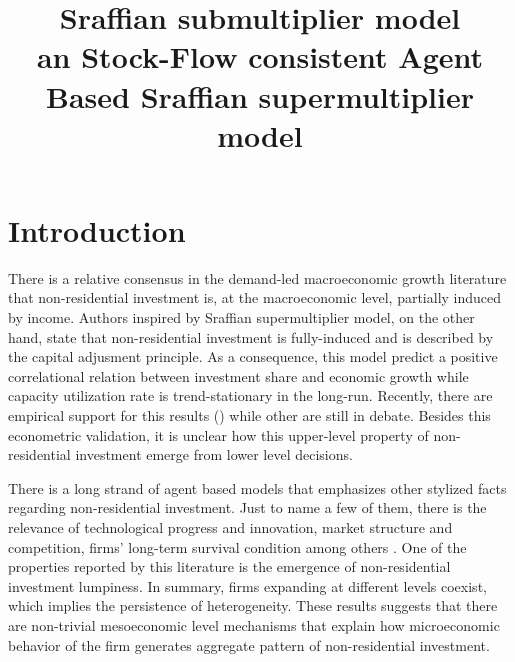 \documentclass{SelfArx}
\date{}
\title{Sraffian submultiplier model\\\medskip
\large an Stock-Flow consistent Agent Based Sraffian supermultiplier model}
\begin{document}


\newcommand{\keywordname}{Keywords} %


\flushbottom %
\maketitle %
\thispagestyle{empty} %

\section{Introduction}
\label{sec:orgee2bb40}
There is a relative consensus in the demand-led macroeconomic growth literature that non-residential investment is, at the macroeconomic level, partially induced by income.
Authors inspired by Sraffian supermultiplier model, on the other hand, state that non-residential investment is fully-induced and is described by the capital adjusment principle.
As a consequence, this model predict a positive correlational relation between investment share and economic growth while capacity utilization rate is trend-stationary in the long-run.
Recently, there are empirical support for this results () while other are still in debate.
Besides this econometric validation, it is unclear how this upper-level property of non-residential investment emerge from lower level decisions.

There is a long strand of agent based models that emphasizes other stylized facts regarding non-residential investment.
Just to name a few of them, there is the relevance of technological progress and innovation, market structure and competition, firms' long-term survival condition among others \cite{caballero_1999_Aggregate}.
One of the properties reported by this literature is the emergence of non-residential investment lumpiness.
In summary, firms expanding at different levels coexist, which implies the persistence of heterogeneity.
These results suggests that there are non-trivial mesoeconomic level mechanisms that explain how microeconomic behavior of the firm generates aggregate pattern of non-residential investment.
\end{document}
